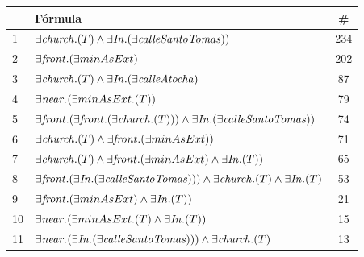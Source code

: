 





\begin{table}[H]
\begin{center}
\begin{tabular}{|l|l|c|}
\hline
&F\'ormula			      &  \# \\ \hline \hline


1&$\exists \mathit{church}.(T) \land \exists \mathit{In} .(\exists \mathit{calleSantoTomas}))$ &234 \\ \hline

2&$\exists \mathit{front} . (\exists minAsExt)$ &202 \\ \hline

3&$\exists \mathit{church}.(T) \land \exists \mathit{In} .(\exists \mathit{calleAtocha})$ &87\\ \hline

4&$\exists \mathit{near} .(\exists minAsExt .(T))$ &79\\ \hline

5&$\exists \mathit{front}.(\exists \mathit{front}.(\exists \mathit{church}.(T))) \land \exists \mathit{In} .(\exists \mathit{calleSantoTomas}))$ &74\\ \hline

6&$\exists \mathit{church}.(T) \land \exists\mathit{front} . (\exists minAsExt))$ &71\\ \hline

7&$\exists \mathit{church}.(T) \land \exists\mathit{front} . (\exists minAsExt) \land \exists \mathit{In} .(T))$ &65\\ \hline

8&$\exists \mathit{front}.(\exists \mathit{In} .(\exists \mathit{calleSantoTomas}))) \land \exists \mathit{church}.(T) \land \exists \mathit{In} .(T)$ &53\\ \hline

9&$\exists \mathit{front} . (\exists minAsExt) \land \exists \mathit{In} .(T))$ &21\\ \hline

10&$\exists \mathit{near} .(\exists minAsExt .(T) \land \exists \mathit{In} .(T))$ &15\\ \hline

11&$\exists  \mathit{near}.(\exists \mathit{In} .(\exists \mathit{calleSantoTomas}))) \land \exists \mathit{church}.(T)$ &13\\ \hline


\end{tabular}
\end{center}
\end{table}
